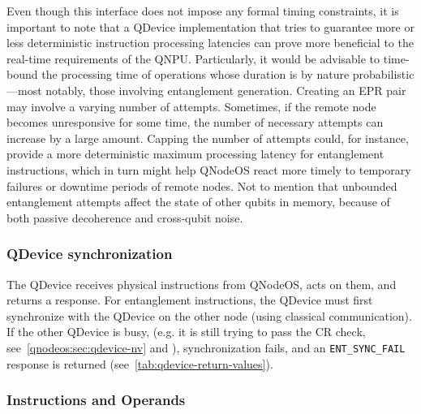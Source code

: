 Even though this interface does not impose any formal timing constraints, it is important to note that a \ac{QDevice} implementation that tries to guarantee more or less deterministic instruction processing latencies can prove more beneficial to the real-time requirements of the \ac{QNPU}. Particularly, it would be advisable to time-bound the processing time of operations whose duration is by nature probabilistic---most notably, those involving entanglement generation. Creating an \ac{EPR} pair may involve a varying number of attempts. Sometimes, if the remote node becomes unresponsive for some time, the number of necessary attempts can increase by a large amount. Capping the number of attempts could, for instance, provide a more deterministic maximum processing latency for entanglement instructions, which in turn might help \ac{QNodeOS} react more timely to temporary failures or downtime periods of remote nodes. Not to mention that unbounded entanglement attempts affect the state of other qubits in memory, because of both passive decoherence and cross-qubit noise.

\subsubsection{QDevice synchronization}
\label{qnodeos:sec:qdevice-sync}
The QDevice receives physical instructions from QNodeOS, acts on them, and returns a response. For entanglement instructions, the QDevice must first synchronize with the QDevice on the other node (using classical communication). If the other QDevice is busy, (e.g. it is still trying to pass the CR check, see~\cref{qnodeos:sec:qdevice-nv} and \cite{pompili_2022_experimental}), synchronization fails, and an \texttt{ENT\_SYNC\_FAIL} response is returned (see~\cref{tab:qdevice-return-values}).

\subsubsection{Instructions and Operands}
\label{qnodeos:sec:sec:appendix-qdevice-instructions-operands}

